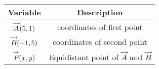 \begin{tabular}[12pt]{ |c| c| }
    \hline
	\textbf{Variable}  & \textbf{Description} \\
    \hline
	$\vec{A}$$\left(5,1\right)$ &  coordinates of first point  \\
    \hline 
	$\vec{B}$$\left(-1,5\right)$ & coordinates of second point \\
    \hline
	$\vec{P}$$\left(x,y\right)$& Equidistant point of $\vec{A}$ and $\vec{B}$  \\
    \hline
         
\end{tabular}
